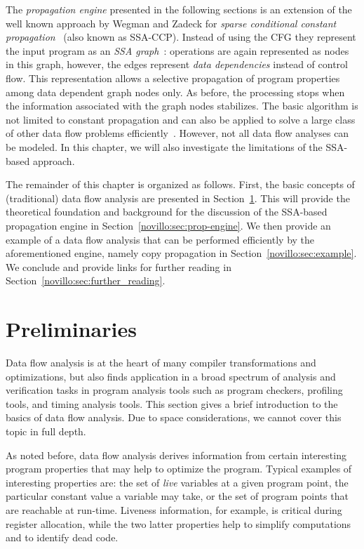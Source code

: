 The \emph{propagation engine} presented in the following sections is an
extension of the well known approach by Wegman and Zadeck for \emph{sparse
conditional constant propagation}~\cite{bib:wegman.ea-91} (also known as
SSA-CCP). Instead of using the CFG they represent the input program as an
\emph{SSA graph}~\cite{novillo:bib:cytron.ea-91}: operations are again represented as
nodes in this graph, however, the edges represent \emph{data dependencies}
instead of control flow. This representation allows a selective propagation of
program properties among data dependent graph nodes only. As before, the
processing stops when the information associated with the graph nodes stabilizes.
The basic algorithm is not limited to constant propagation and can also be
applied to solve a large class of other data flow problems
efficiently~\cite{novillo:bib:N05}. However, not all data flow
analyses can be modeled. In this chapter, we will also investigate the limitations
of the SSA-based approach.

The remainder of this chapter is organized as follows. First, the basic concepts
of (traditional) data flow analysis are presented in
Section~\ref{novillo:sec:preliminaries}. This will provide the theoretical
foundation and background for the discussion of the SSA-based propagation
engine in Section~\ref{novillo:sec:prop-engine}. We then provide an example of a
data flow analysis that can be performed efficiently by the aforementioned
engine, namely copy propagation in Section~\ref{novillo:sec:example}. We
conclude and provide links for further reading in
Section~\ref{novillo:sec:further_reading}.

\section{Preliminaries}
\label{novillo:sec:preliminaries}

Data flow analysis is at the heart of many compiler transformations and
optimizations, but also finds application in a broad spectrum of analysis and
verification tasks in program analysis tools such as program checkers, profiling
tools, and timing analysis tools. This section gives a brief introduction to the
basics of data flow analysis. Due to space considerations, we cannot cover this
topic in full depth.

As noted before, data flow analysis derives information from certain
interesting program properties that may help to optimize the program. Typical
examples of interesting properties are: the set of \emph{live} variables at a
given program point, the particular constant value a variable may take, or the
set of program points that are reachable at run-time. Liveness information, for
example, is critical during register allocation, while the two latter properties
help to simplify computations and to identify dead code.

